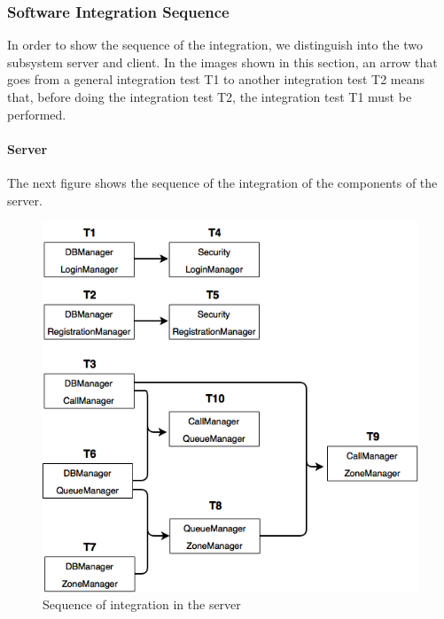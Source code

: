 \subsubsection{Software Integration Sequence}
\label{sectionIntegration}
In order to show the sequence of the integration, we distinguish into the two subsystem server and client.
\newline
In the images shown in this section, an arrow that goes from a general integration test T1 to another integration test T2 means that, before doing the integration test T2, the integration test T1 must be performed.

\newpage
\paragraph{Server}\mbox{}
\newline 
The next figure shows the sequence of the integration of the components of the server.
\newline

\begin{figure}[H]
    \centering
    \includegraphics[width=13cm]{./Images/System-2.png}
    \caption{Sequence of integration in the server}
    \label{fig: Sequence of integration in the server}
\end{figure}
\newpage

